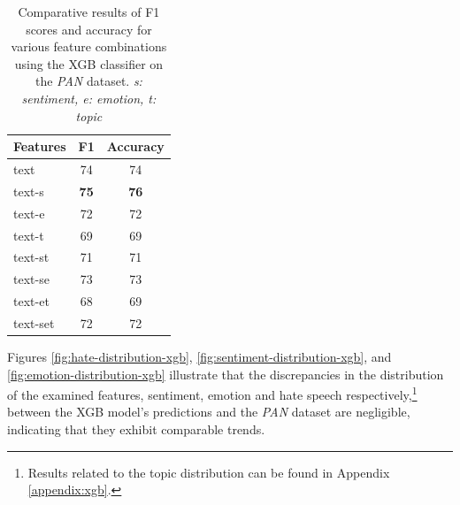 \begin{table}[]
\centering
\begin{tabular}{|l|c|c|}
\hline
\textbf{Features} & \textbf{F1} & \textbf{Accuracy} \\ \hline
text     & 74          & 74                \\ \hline
text-s   & \textbf{75}          & \textbf{76}                \\ \hline
text-e   & 72          & 72                \\ \hline
text-t   & 69          & 69                \\ \hline
text-st  & 71          & 71                \\ \hline
text-se  & 73          & 73                \\ \hline
text-et  & 68          & 69                \\ \hline
text-set & 72          & 72                \\ \hline
\end{tabular}

\caption{Comparative results of F1 scores and accuracy for various feature combinations using the XGB classifier on the \textit{PAN} dataset. \textit{s: sentiment, e: emotion, t: topic}}\label{tab:xgb-extra}
\end{table}


Figures \ref{fig:hate-distribution-xgb}, \ref{fig:sentiment-distribution-xgb}, and \ref{fig:emotion-distribution-xgb} illustrate that the discrepancies in the distribution of the examined features, sentiment, emotion and hate speech respectively,\footnote{Results related to the topic distribution can be found in Appendix \ref{appendix:xgb}.} between the XGB model's predictions and the \textit{PAN} dataset are negligible, indicating that they exhibit comparable trends.



